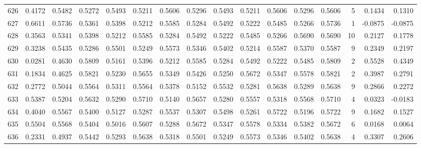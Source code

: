 \begin{tabular}{lrrrrrrrrrrrrrrr}
626 &      0.4172 &  0.5482 &  0.5272 &  0.5493 &  0.5211 &  0.5606 &  0.5296 &  0.5493 &  0.5211 &  0.5606 &   0.5296 &     0.5606 &      5 &                    0.1434 &                     0.1310 \\
627 &      0.6611 &  0.5736 &  0.5361 &  0.5398 &  0.5212 &  0.5585 &  0.5284 &  0.5492 &  0.5222 &  0.5485 &   0.5266 &     0.5736 &      1 &                   -0.0875 &                    -0.0875 \\
628 &      0.3563 &  0.5341 &  0.5398 &  0.5212 &  0.5585 &  0.5284 &  0.5492 &  0.5222 &  0.5485 &  0.5266 &   0.5690 &     0.5690 &     10 &                    0.2127 &                     0.1778 \\
629 &      0.3238 &  0.5435 &  0.5286 &  0.5501 &  0.5249 &  0.5573 &  0.5346 &  0.5402 &  0.5214 &  0.5587 &   0.5370 &     0.5587 &      9 &                    0.2349 &                     0.2197 \\
630 &      0.0281 &  0.4630 &  0.5809 &  0.5161 &  0.5396 &  0.5212 &  0.5585 &  0.5284 &  0.5492 &  0.5222 &   0.5485 &     0.5809 &      2 &                    0.5528 &                     0.4349 \\
631 &      0.1834 &  0.4625 &  0.5821 &  0.5230 &  0.5655 &  0.5349 &  0.5426 &  0.5250 &  0.5672 &  0.5347 &   0.5578 &     0.5821 &      2 &                    0.3987 &                     0.2791 \\
632 &      0.2772 &  0.5044 &  0.5564 &  0.5311 &  0.5564 &  0.5378 &  0.5152 &  0.5532 &  0.5281 &  0.5638 &   0.5289 &     0.5638 &      9 &                    0.2866 &                     0.2272 \\
633 &      0.5387 &  0.5204 &  0.5632 &  0.5290 &  0.5710 &  0.5140 &  0.5657 &  0.5280 &  0.5557 &  0.5318 &   0.5568 &     0.5710 &      4 &                    0.0323 &                    -0.0183 \\
634 &      0.4040 &  0.5567 &  0.5400 &  0.5127 &  0.5287 &  0.5537 &  0.5307 &  0.5498 &  0.5261 &  0.5722 &   0.5196 &     0.5722 &      9 &                    0.1682 &                     0.1527 \\
635 &      0.5504 &  0.5568 &  0.5404 &  0.5016 &  0.5607 &  0.5288 &  0.5672 &  0.5347 &  0.5578 &  0.5334 &   0.5382 &     0.5672 &      6 &                    0.0168 &                     0.0064 \\
636 &      0.2331 &  0.4937 &  0.5442 &  0.5293 &  0.5638 &  0.5318 &  0.5501 &  0.5249 &  0.5573 &  0.5346 &   0.5402 &     0.5638 &      4 &                    0.3307 &                     0.2606 \\

\end{tabular}
